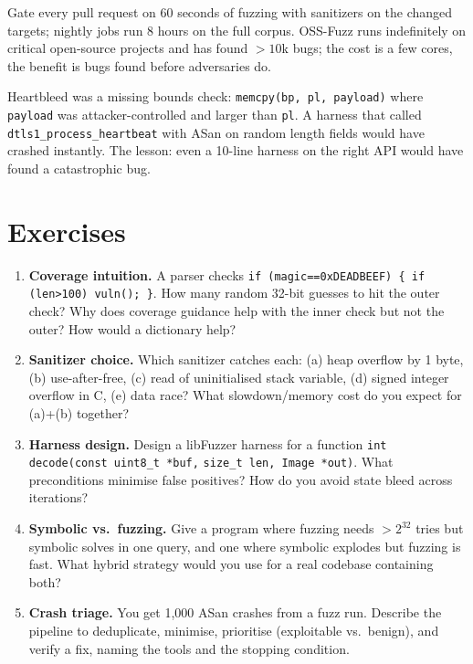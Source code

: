 \begin{remark}[Fuzzing in CI]
Gate every pull request on 60 seconds of fuzzing with sanitizers on the changed targets; nightly jobs run 8 hours on the full corpus. OSS-Fuzz runs indefinitely on critical open-source projects and has found $>10$k bugs; the cost is a few cores, the benefit is bugs found before adversaries do.
\end{remark}


{\sloppy
\begin{example}
Heartbleed was a missing bounds check: \texttt{memcpy(bp, pl, payload)} where \texttt{payload} was attacker-controlled and larger than \texttt{pl}. A harness that called \texttt{dtls1\_process\_heartbeat} with ASan on random length fields would have crashed instantly. The lesson: even a 10-line harness on the right API would have found a catastrophic bug.
\end{example}
\par}

\section{Exercises}
\label{sec:ch05-exercises}
{\sloppy
\begin{enumerate}[label=E5.\arabic*, leftmargin=*, itemsep=0.6em]
    \item \textbf{Coverage intuition.} A parser checks \texttt{if (magic==0xDEADBEEF) \{ if (len>100) vuln(); \}}. How many random 32-bit guesses to hit the outer check? Why does coverage guidance help with the inner check but not the outer? How would a dictionary help?
    \item \textbf{Sanitizer choice.} Which sanitizer catches each: (a) heap overflow by 1 byte, (b) use-after-free, (c) read of uninitialised stack variable, (d) signed integer overflow in C, (e) data race? What slowdown/memory cost do you expect for (a)+(b) together?
    \item \textbf{Harness design.} Design a libFuzzer harness for a function \texttt{int decode(const uint8\_t *buf,} \texttt{size\_t len, Image *out)}. What preconditions minimise false positives? How do you avoid state bleed across iterations?
    \item \textbf{Symbolic vs.\ fuzzing.} Give a program where fuzzing needs $>2^{32}$ tries but symbolic solves in one query, and one where symbolic explodes but fuzzing is fast. What hybrid strategy would you use for a real codebase containing both?
    \item \textbf{Crash triage.} You get 1,000 ASan crashes from a fuzz run. Describe the pipeline to deduplicate, minimise, prioritise (exploitable vs.\ benign), and verify a fix, naming the tools and the stopping condition.
\end{enumerate}
\par}

